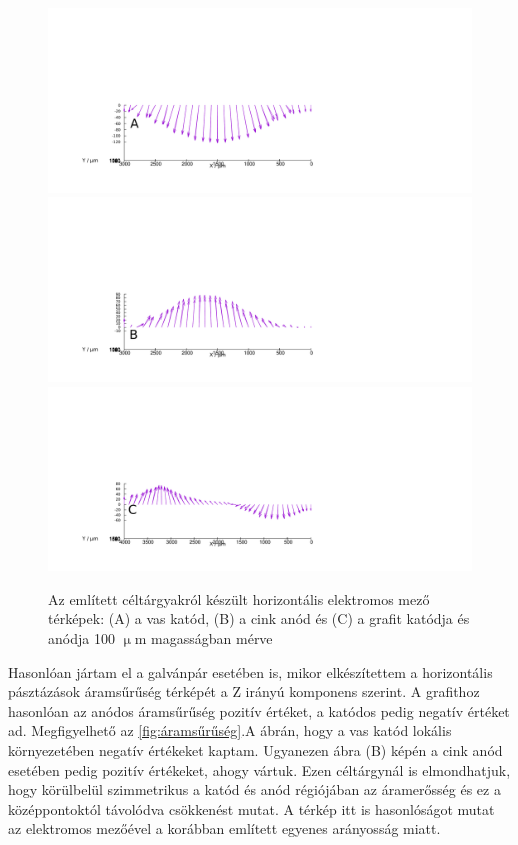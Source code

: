 \begin{figure}
\centering
\includegraphics[width=1.2\textwidth]{img/mérések/Fe_h100.pdf}
\includegraphics[width=1.2\textwidth]{img/mérések/Zn_h100.pdf}
\includegraphics[width=1.2\textwidth]{img/mérések/grafit_h100.pdf}

\caption{Az említett céltárgyakról készült horizontális elektromos mező térképek:
(A) a vas katód, (B) a cink anód és (C) a grafit katódja és anódja 100 $\upmu$m magasságban mérve}
\label{fig:field_h}
\end{figure}


Hasonlóan jártam el a galvánpár esetében is, mikor elkészítettem a horizontális pásztázások áramsűrűség térképét a Z irányú komponens szerint. A grafithoz hasonlóan az anódos áramsűrűség pozitív értéket, a katódos pedig negatív értéket ad. Megfigyelhető az \ref{fig:áramsűrűség}.A ábrán, hogy a vas katód lokális környezetében negatív értékeket kaptam. Ugyanezen ábra (B) képén a cink anód esetében pedig pozitív értékeket, ahogy vártuk. Ezen céltárgynál is elmondhatjuk, hogy körülbelül szimmetrikus a katód és anód régiójában az áramerősség és ez a középpontoktól távolódva csökkenést mutat. A térkép itt is hasonlóságot mutat az elektromos mezőével a korábban említett egyenes arányosság miatt. 

